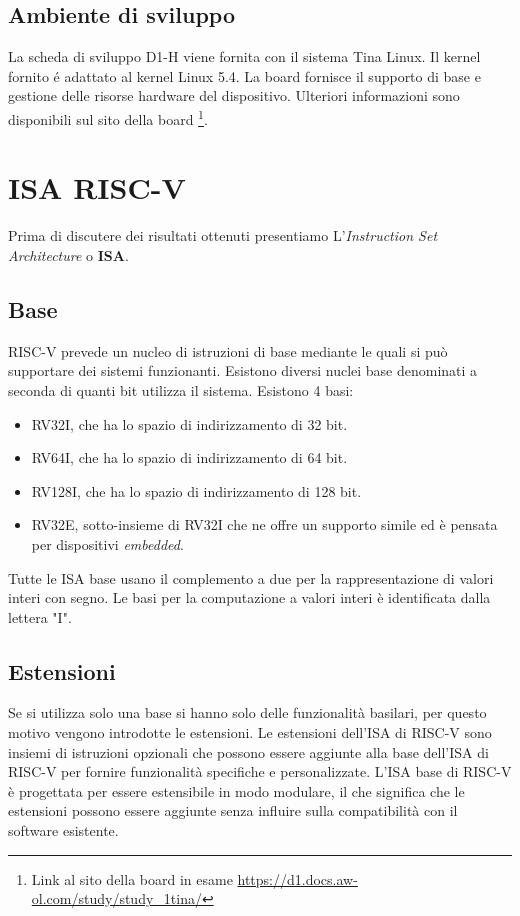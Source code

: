 \documentclass[12pt, a4paper]{report}
\begin{document}
\section{Ambiente di sviluppo}
La scheda di sviluppo D1-H viene fornita con il sistema Tina Linux. Il kernel fornito \'e adattato al kernel Linux 5.4. La board fornisce il supporto di base e gestione delle risorse hardware del dispositivo. Ulteriori informazioni sono disponibili sul sito della board
\footnote{Link al sito della board in esame \url{https://d1.docs.aw-ol.com/study/study_1tina/}}.


% 
\chapter{ISA RISC-V}
Prima di discutere dei risultati ottenuti presentiamo L'\textit{Instruction Set Architecture} o \textbf{ISA}.
\section{Base}
RISC-V prevede un nucleo di istruzioni di base mediante le quali si può supportare dei sistemi funzionanti. Esistono diversi nuclei base denominati a seconda di quanti bit utilizza il sistema. Esistono 4 basi:
\begin{itemize}
	\item RV32I, che ha lo spazio di indirizzamento di 32 bit. 
	\item RV64I, che ha lo spazio di indirizzamento di 64 bit.
	\item RV128I, che ha lo spazio di indirizzamento di 128 bit.
	\item RV32E, sotto-insieme di RV32I che ne offre un supporto simile ed è pensata per dispositivi \textit{embedded}.
\end{itemize}
Tutte le ISA base usano il complemento a due per la rappresentazione di valori interi con segno. Le basi per la computazione a valori interi è identificata dalla lettera "I". 

\section{Estensioni} \label{estensioni}
Se si utilizza solo una base si hanno solo delle funzionalità basilari, per questo motivo vengono introdotte le estensioni. Le estensioni dell'ISA di RISC-V sono insiemi di istruzioni opzionali che possono essere aggiunte alla base dell'ISA di RISC-V per fornire funzionalità specifiche e personalizzate. L'ISA base di RISC-V è progettata per essere estensibile in modo modulare, il che significa che le estensioni possono essere aggiunte senza influire sulla compatibilità con il software esistente.
\end{document}
